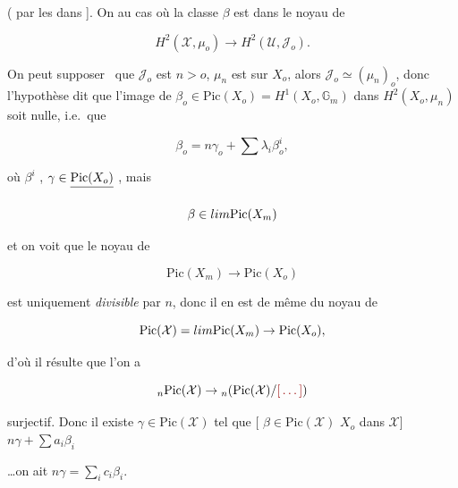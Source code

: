 \documentclass[11pt,a4paper]{article}
\begin{document}

( par les   dans \struck{\ill{}} \ill{}]. On  au cas où la
classe $\beta$ est dans le noyau de

\[ H^{2}(\mathcal{X}, \mu_{o}) \to H^{2}(\mathcal{U}, \mathcal{J}_{o}). \]

On peut supposer \ill{} \ que $\mathcal{J}_{o}$ est  $n > o$,
$\mu_{n}$ est  sur $X_{o}$, alors $\mathcal{J}_{o} \simeq
(\mu_{n})_{o}$, donc l'hypothèse dit que l'image de $\beta_{o} \in
\mathrm{Pic}(X_{o}) = H^{1}(X_{o}, \mathbb{G}_{m})$ dans $H^{2}(X_{o},
\mu_{n})$ soit  nulle,
i.e.\ que \struck{\ill{}}

\[ \beta_{o} = n\gamma_{o} + \sum \lambda_{i} \beta_{o}^{i}, \]

où $\beta^{i}$ \ill{}, $\gamma \in \struck{\mathrm{Pic}(X_{o})}$ \ill{}, mais
\ill{}

\[ \beta \in \varprojlim \mathrm{Pic}(X_{m}) \]

et on voit que le noyau de

\[ \mathrm{Pic}(X_{m}) \to \mathrm{Pic}(X_{o}) \]

est  uniquement \emph{divisible} par $n$, donc il en est de
même du noyau de


\[ \mathrm{Pic}(\mathcal{X}) = \varprojlim \mathrm{Pic}(X_{m}) \to
\mathrm{Pic}(X_{o}), \]

d'où il résulte que l'on a

\[ {}_{n}\mathrm{Pic}(\mathcal{X}) \to {}_{n}\!\left(\mathrm{Pic}(\mathcal{X})/\ill\right) \]

surjectif. Donc il existe $\gamma \in \mathrm{Pic}(\mathcal{X})$ tel que
[ $\beta \in \mathrm{Pic}(\mathcal{X})$  $X_{o}$ dans $\mathcal{X}$] \struck{\ill{}} \ill{} $n\gamma + \sum
a_{i} \beta_{i}$


\ldots on ait $n\gamma = \sum_{i} c_{i} \beta_{i}$.
\end{document}
